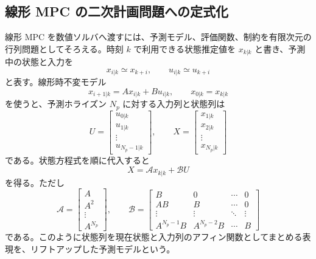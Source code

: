 \subsection{線形 MPC の二次計画問題への定式化}

線形 MPC を数値ソルバへ渡すには、予測モデル、評価関数、制約を有限次元の行列問題としてそろえる。時刻 $k$ で利用できる状態推定値を $x_{k|k}$ と書き、予測中の状態と入力を
\begin{equation}
  x_{i|k}\simeq x_{k+i},
  \qquad
  u_{i|k}\simeq u_{k+i}
\end{equation}
と表す。線形時不変モデル
\begin{equation}
  x_{i+1|k}=Ax_{i|k}+Bu_{i|k},
  \qquad
  x_{0|k}=x_{k|k}
\end{equation}
を使うと、予測ホライズン $N_p$ に対する入力列と状態列は
\begin{equation}
  U=
  \begin{bmatrix}
    u_{0|k}\\u_{1|k}\\\vdots\\u_{N_p-1|k}
  \end{bmatrix},
  \qquad
  X=
  \begin{bmatrix}
    x_{1|k}\\x_{2|k}\\\vdots\\x_{N_p|k}
  \end{bmatrix}
\end{equation}
である。状態方程式を順に代入すると
\begin{equation}
  X=\mathcal{A}x_{k|k}+\mathcal{B}U
\end{equation}
を得る。ただし
\begin{equation}
  \mathcal{A}=
  \begin{bmatrix}
    A\\A^2\\\vdots\\A^{N_p}
  \end{bmatrix},
  \qquad
  \mathcal{B}=
  \begin{bmatrix}
    B&0&\cdots&0\\
    AB&B&\cdots&0\\
    \vdots&\vdots&\ddots&\vdots\\
    A^{N_p-1}B&A^{N_p-2}B&\cdots&B
  \end{bmatrix}
\end{equation}
である。このように状態列を現在状態と入力列のアフィン関数としてまとめる表現を、リフトアップした予測モデルという。

